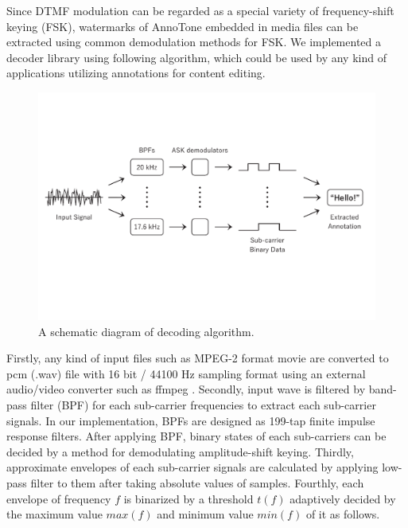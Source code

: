 Since DTMF modulation can be regarded as a special variety of frequency-shift keying (FSK), watermarks of AnnoTone embedded in media files can be extracted using common demodulation methods for FSK.
We implemented a decoder library using following algorithm, which could be used by any kind of applications utilizing annotations for content editing.

\begin{figure}[htbp]
 \begin{center}
  \includegraphics[width=140mm]{implementation_decode.pdf}
 \end{center}
 \caption{A schematic diagram of decoding algorithm.}
 \label{fig:impl_decd}
\end{figure}

Firstly, any kind of input files such as MPEG-2 format movie are converted to pcm (.wav) file with 16 bit / 44100 Hz sampling format using an external audio/video converter such as ffmpeg \cite{ffmpeg}.
Secondly, input wave is filtered by band-pass filter (BPF) for each sub-carrier frequencies to extract each sub-carrier signals.
In our implementation, BPFs are designed as 199-tap finite impulse response filters.
After applying BPF, binary states of each sub-carriers can be decided by a method for demodulating amplitude-shift keying.
Thirdly, approximate envelopes of each sub-carrier signals are calculated by applying low-pass filter to them after taking absolute values of samples.
Fourthly, each envelope of frequency $f$ is binarized by a threshold $t(f)$ adaptively decided by the maximum value $max(f)$ and minimum value $min(f)$ of it as follows.

